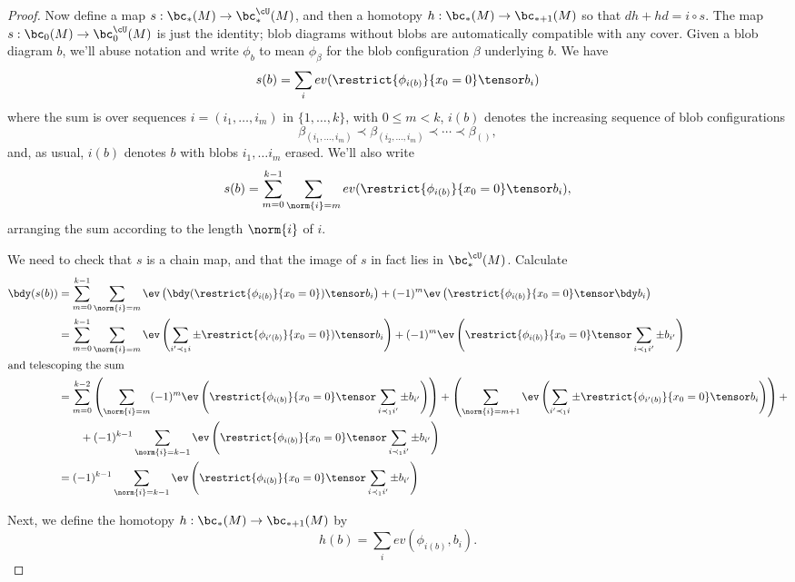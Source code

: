 \begin{proof}
Now define a map $s: \bc_*(M) \to \bc^{\cU}_*(M)$, and then a homotopy $h:\bc_*(M) \to \bc_{*+1}(M)$ so that $dh+hd=i\circ s$. The map $s: \bc_0(M) \to \bc^{\cU}_0(M)$ is just the identity; blob diagrams without blobs are automatically compatible with any cover. Given a blob diagram $b$, we'll abuse notation and write $\phi_b$ to mean $\phi_\beta$ for the blob configuration $\beta$ underlying $b$. We have
$$s(b) = \sum_{i} ev(\restrict{\phi_{i(b)}}{x_0 = 0} \tensor b_i)$$
where the sum is over sequences $i=(i_1,\ldots,i_m)$ in $\{1,\ldots,k\}$, with $0\leq m < k$, $i(b)$ denotes the increasing sequence of blob configurations
$$\beta_{(i_1,\ldots,i_m)} \prec \beta_{(i_2,\ldots,i_m)} \prec \cdots \prec \beta_{()},$$
and, as usual, $i(b)$ denotes $b$ with blobs $i_1, \ldots i_m$ erased. We'll also write
$$s(b) = \sum_{m=0}^{k-1} \sum_{\norm{i}=m} ev(\restrict{\phi_{i(b)}}{x_0 = 0} \tensor b_i),$$
arranging the sum according to the length $\norm{i}$ of $i$.


We need to check that $s$ is a chain map, and that the image of $s$ in fact lies in $\bc^{\cU}_*(M)$. \todo{} Calculate
\begin{align*}
\bdy(s(b)) & = \sum_{m=0}^{k-1} \sum_{\norm{i}=m} \ev\left(\bdy(\restrict{\phi_{i(b)}}{x_0 = 0})\tensor b_i\right) + (-1)^m \ev\left(\restrict{\phi_{i(b)}}{x_0 = 0} \tensor \bdy b_i\right) \\
                & = \sum_{m=0}^{k-1} \sum_{\norm{i}=m} \ev\left(\sum_{i' \prec_1 i} \pm \restrict{\phi_{i'(b)}}{x_0 = 0})\tensor b_i\right) + (-1)^m \ev\left(\restrict{\phi_{i(b)}}{x_0 = 0}\tensor \sum_{i \prec_1 i'} \pm b_{i'}\right) \\
\intertext{and telescoping the sum}
		& = \sum_{m=0}^{k-2} \left(\sum_{\norm{i}=m}  (-1)^m \ev\left(\restrict{\phi_{i(b)}}{x_0 = 0} \tensor \sum_{i \prec_1 i'} \pm b_{i'}\right) \right) + \left(\sum_{\norm{i}=m+1} \ev\left(\sum_{i' \prec_1 i} \pm \restrict{\phi_{i'(b)}}{x_0 = 0} \tensor b_i\right) \right) + \\
		& \qquad + (-1)^{k-1} \sum_{\norm{i}=k-1} \ev\left(\restrict{\phi_{i(b)}}{x_0 = 0} \tensor \sum_{i \prec_1 i'} \pm b_{i'}\right) \\
		& = (-1)^{k-1} \sum_{\norm{i}=k-1} \ev\left(\restrict{\phi_{i(b)}}{x_0 = 0} \tensor \sum_{i \prec_1 i'} \pm b_{i'}\right)
\end{align*}

Next, we define the homotopy $h:\bc_*(M) \to \bc_{*+1}(M)$ by
$$h(b) = \sum_{i} ev(\phi_{i(b)}, b_i).$$
\end{proof}
